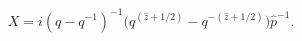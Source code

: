 \begin{equation}
\label{Eq:X-variable}
X=i(q-q^{-1})^{-1} \bigl( q^{(\hat z+1/2)} -
q^{-(\hat z+1/2)}\bigr)\hat p^{-1}.
\end{equation}

